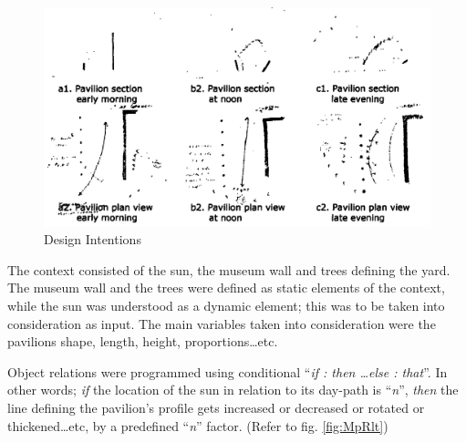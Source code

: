 \begin{figure}[htbp]
\centering
\includegraphics[width=\textwidth]{./Images/3-DesignIntent}
\caption[Pavilion Design Intentions]{Design Intentions \cite{zulas04}}
\label{fig:DesignInt}
\end{figure}

The context consisted of the sun, the museum wall and trees defining the yard. The museum wall and the trees were defined as static elements of the context, while the sun was understood as a dynamic element; this was to be taken into consideration as input. The main variables taken into consideration were the pavilions shape, length, height, proportions\ldots etc. 

Object relations were programmed using conditional ``\emph{if : then \dots else : that}''. In other words; \emph{if} the location of the sun in relation to its day-path is ``\emph{n}'', \emph{then} the line defining the pavilion's profile gets increased or decreased or rotated or thickened\ldots etc, by a predefined ``\emph{n}'' factor. (Refer to fig. \ref{fig:MpRlt})

